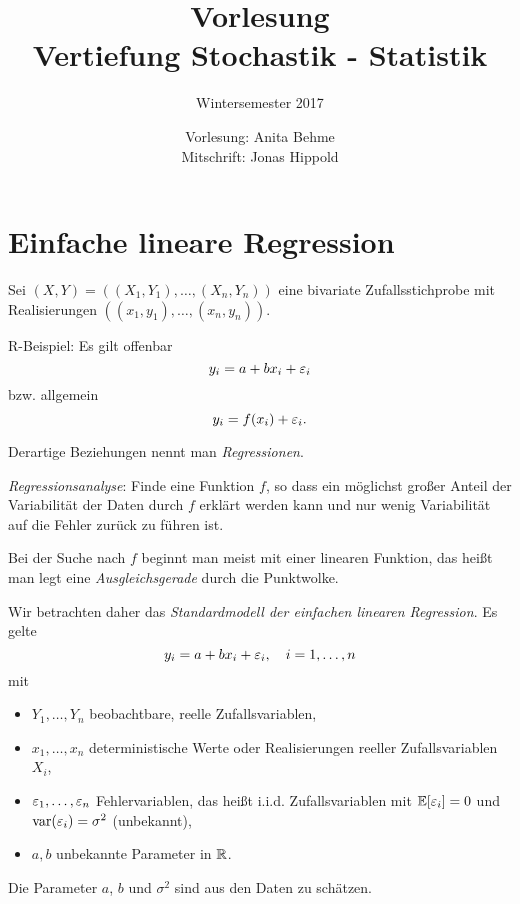 \documentclass[
 a4paper,
 12pt,
 parskip=half
 ]{scrreprt}
\title{Vorlesung\\Vertiefung Stochastik - Statistik}
\subtitle{Wintersemester 2017}
\author{Vorlesung: Anita Behme\\Mitschrift: Jonas Hippold}
\theoremstyle{plain}
\theoremstyle{definition}
\numberwithin{equation}{chapter}
\begin{document}
\maketitle

\tableofcontents

\clearpage









\chapter{Einfache lineare Regression}\label{ch:regression}
Sei $(X,Y) = ((X_1, Y_1), \ldots, (X_n,Y_n))$ eine bivariate Zufallsstichprobe
mit Realisierungen $((x_1,y_1), \ldots, (x_n, y_n))$.

R-Beispiel: Es gilt offenbar
\[ y_i = a + b x_i + \varepsilon_i \]
bzw. allgemein
\[ y_i = f(x_i) + \varepsilon_i. \]

Derartige Beziehungen nennt man \emph{Regressionen}.

\emph{Regressionsanalyse}: Finde eine Funktion $f$, so dass ein möglichst großer
Anteil der Variabilität der Daten durch $f$ erklärt werden kann und nur wenig
Variabilität auf die Fehler zurück zu führen ist.

Bei der Suche nach $f$ beginnt man meist mit einer linearen Funktion, das heißt
man legt eine \emph{Ausgleichsgerade} durch die Punktwolke.

Wir betrachten daher das \emph{Standardmodell der einfachen linearen
  Regression}. Es gelte
\begin{equation}
  y_i = a + b x_i + \varepsilon_i, \quad i = 1, \ldots, n
\end{equation}
mit
\begin{itemize}
\item $Y_1, \ldots, Y_n$ beobachtbare, reelle Zufallsvariablen,
\item $x_1, \ldots, x_n$ deterministische Werte oder Realisierungen reeller
  Zufallsvariablen $X_i$,
\item $\varepsilon_1, \ldots, \varepsilon_n$ Fehlervariablen, das heißt i.i.d.
  Zufallsvariablen mit $\mathbb{E}[\varepsilon_i] = 0$ und $\operatorname{var}(\varepsilon_i) = \sigma^2$
  (unbekannt),
\item $a,b$ unbekannte Parameter in $\mathbb{R}$.
\end{itemize}

Die Parameter $a$, $b$ und $\sigma^2$ sind aus den Daten zu schätzen.
\end{document}
